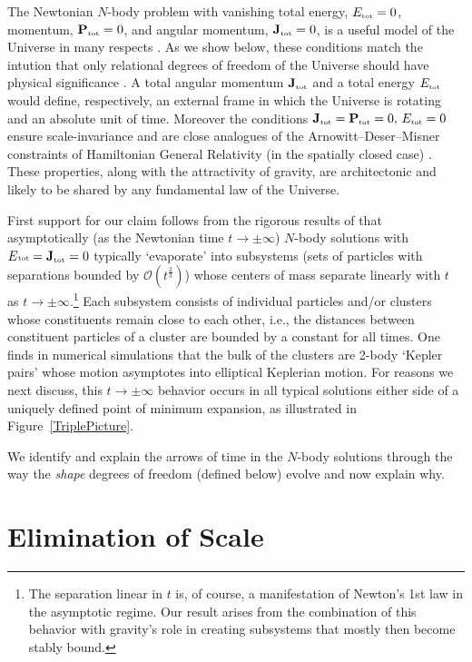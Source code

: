 \documentclass[prl,nofootinbib,twocolumn,superscriptaddress]{revtex4}
\newcommand{\st}[1]{\text{\tiny \rm #1}}
\begin{document}
The Newtonian $N$-body problem  with vanishing total energy, $E_\st{tot}=0$, momentum, ${\bf P}_\st{tot}  = 0$, and angular momentum, ${\bf J}_\st{tot}=0$, is a useful model of the Universe in many respects \cite{GibbonsEllis}. As we show below, these conditions match the intution that only relational degrees of freedom of the Universe should have physical significance \cite{barbourbertotti:mach,JuliansReview,FlaviosSDtutorial}. A total angular momentum ${\bf J}_\st{tot}$ and a total energy $E_\st{tot}$ would define, respectively, an external frame in which the Universe is rotating and an absolute unit of time. Moreover the conditions ${\bf J}_\st{tot} = {\bf P}_\st{tot}  = 0,\,E_\st{tot}=0$ ensure scale-invariance and are close analogues of the Arnowitt--Deser--Misner constraints of Hamiltonian General Relativity (in the spatially closed case) \cite{LongPaper}. These properties, along with the attractivity of gravity, are architectonic and likely to be shared by any fundamental law of the Universe.

First support for our claim follows from the rigorous results of \cite{Marchial:1976fi} that asymptotically (as the Newtonian time $t\rightarrow \pm\infty$) $N$-body solutions with $E\st{tot}={\bf J}_\st{tot} =0$ typically `evaporate' into subsystems (sets of particles with separations bounded by $\mathcal O(t^{\frac 2 3})$) whose centers of mass separate linearly with $t$ as $t\rightarrow\pm\infty$.\footnote{The separation linear in $t$ is, of course, a manifestation of Newton's 1st law in the asymptotic regime. Our result arises from the combination of this behavior with gravity's role in creating subsystems that mostly then become stably bound.} Each subsystem consists of individual particles and/or clusters whose constituents remain close to each other, i.e., the distances between constituent particles of a cluster are bounded by a constant for all times. One finds in numerical simulations that the bulk of the clusters are 2-body `Kepler pairs' whose motion asymptotes into elliptical Keplerian motion. For reasons we next discuss, this $t\rightarrow\pm\infty$ behavior occurs in all typical solutions either side of a uniquely defined point of minimum expansion, as illustrated in Figure~\ref{TriplePicture}.

We identify and explain the arrows of time in the $N$-body solutions through the way the {\it shape} degrees of freedom (defined below) evolve and now explain why.

\section{Elimination of Scale}
\end{document}
